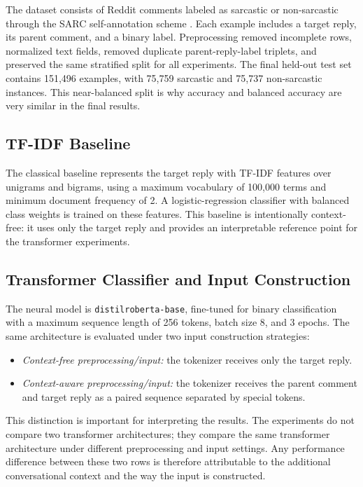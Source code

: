 \documentclass[%
 reprint,
 amsmath,amssymb,
 aps,
]{revtex4-2}
\begin{document}
The dataset consists of Reddit comments labeled as sarcastic or non-sarcastic through the SARC self-annotation scheme \cite{khodak2018large}. Each example includes a target reply, its parent comment, and a binary label. Preprocessing removed incomplete rows, normalized text fields, removed duplicate parent-reply-label triplets, and preserved the same stratified split for all experiments. The final held-out test set contains 151,496 examples, with 75,759 sarcastic and 75,737 non-sarcastic instances. This near-balanced split is why accuracy and balanced accuracy are very similar in the final results.

\subsection*{TF-IDF Baseline}

The classical baseline represents the target reply with TF-IDF features over unigrams and bigrams, using a maximum vocabulary of 100,000 terms and minimum document frequency of 2. A logistic-regression classifier with balanced class weights is trained on these features. This baseline is intentionally context-free: it uses only the target reply and provides an interpretable reference point for the transformer experiments.

\subsection*{Transformer Classifier and Input Construction}

The neural model is \texttt{distilroberta-base}, fine-tuned for binary classification with a maximum sequence length of 256 tokens, batch size 8, and 3 epochs. The same architecture is evaluated under two input construction strategies:

\begin{itemize}
    \item \textit{Context-free preprocessing/input:} the tokenizer receives only the target reply.
    \item \textit{Context-aware preprocessing/input:} the tokenizer receives the parent comment and target reply as a paired sequence separated by special tokens.
\end{itemize}

This distinction is important for interpreting the results. The experiments do not compare two transformer architectures; they compare the same transformer architecture under different preprocessing and input settings. Any performance difference between these two rows is therefore attributable to the additional conversational context and the way the input is constructed.
\end{document}
